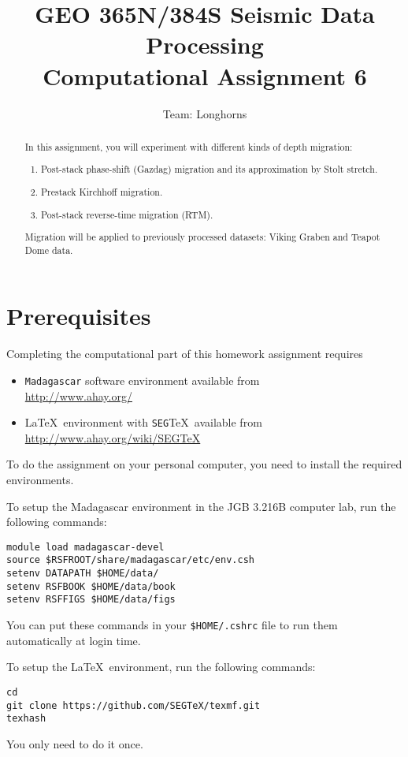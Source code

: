 \author{Team: Longhorns}
\title{GEO 365N/384S Seismic Data Processing \\ Computational Assignment 6}

\begin{abstract}
In this assignment, you will experiment with different kinds of depth migration:
  \begin{enumerate}
  \item Post-stack phase-shift (Gazdag) migration and its approximation by Stolt stretch.
  \item Prestack Kirchhoff migration.
  \item Post-stack reverse-time migration (RTM).
  \end{enumerate}
Migration will be applied to previously processed datasets: Viking Graben and Teapot Dome data.
\end{abstract}

\section{Prerequisites}

Completing the computational part of this homework assignment requires
\begin{itemize}
\item \texttt{Madagascar} software environment available from \\
\url{http://www.ahay.org/}
\item \LaTeX\ environment with \texttt{SEG}\TeX\ available from \\ 
\url{http://www.ahay.org/wiki/SEGTeX}
\end{itemize}
To do the assignment on your personal computer, you need to install
the required environments. 

To setup the Madagascar environment in the JGB 3.216B computer lab, run the following commands:
\begin{verbatim}
module load madagascar-devel
source $RSFROOT/share/madagascar/etc/env.csh
setenv DATAPATH $HOME/data/
setenv RSFBOOK $HOME/data/book
setenv RSFFIGS $HOME/data/figs
\end{verbatim}
You can put these commands in your \verb+$HOME/.cshrc+ file to run them automatically at login time.

To setup the \LaTeX\ environment, run the following commands:
\begin{verbatim}
cd
git clone https://github.com/SEGTeX/texmf.git
texhash
\end{verbatim}
You only need to do it once.

